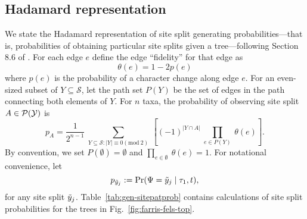 \subsection*{Hadamard representation}

We state the Hadamard representation of site split generating probabilities---that is, probabilities of obtaining particular site splits given a tree---following Section 8.6 of \citet{Semple2003-em}.
For each edge $e$ define the edge ``fidelity'' for that edge as
\[
\theta(e) = 1-2p(e)
\]
where $p(e)$ is the probability of a character change along edge $e$.
For an even-sized subset of $Y\subseteq\mathcal{S}$, let the path set $P(Y)$ be the set of edges in the path connecting both elements of $Y$.
For $n$ taxa, the probability of observing site split $A\in\mathcal{P}(\mathcal{Y})$ is
\begin{equation}
\label{eq:hadamard_probability}
p_A = \frac{1}{2^{n-1}} \ \sum_{Y \subseteq \mathcal{S} : |Y| \equiv 0 (\mathrm{mod} \ 2)} \ \left[(-1)^{|Y \cap A|} \ \prod_{e\in P(Y)} \ \theta(e) \right].
\end{equation}
By convention, we set $P(\emptyset)=\emptyset$ and $\prod_{e\in\emptyset} \ \theta(e) = 1$.
For notational convenience, let
\[
p_{\tilde{y}_j} := \Pr(\Psi=\tilde{y}_j \mid \tau_1,t),
\]
for any site split $\tilde{y}_j$.
Table~\ref{tab:gen-sitepatprob} contains calculations of site split probabilities for the trees in Fig.~\ref{fig:farris-fels-top}.

